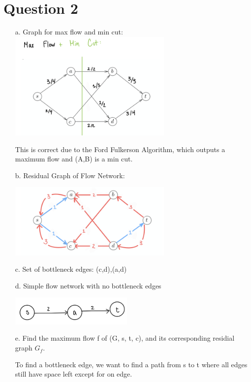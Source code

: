 \documentclass[12pt]{article}
\begin{document}
\section*{Question 2}
\begin{enumerate}
    \item[a.] Graph for max flow and min cut:\\
        
        \includegraphics[width=8cm]{Graphs/2A.png}

        This is correct due to the Ford Fulkerson Algorithm, which outputs a maximum flow and (A,B) is a min cut.

    \item[b.]  Residual Graph of Flow Network:

        \includegraphics[width=8cm]{Graphs/2B.png}

    \item[c. ]Set of bottleneck edges: {(c,d),(a,d)}
    \item[d. ] Simple flow network with no bottleneck edges
    
        \includegraphics[width=6cm]{Graphs/2C.png}

    \item[e. ] Find the maximum flow f of (G, s, t, c), and its corresponding residial
               graph $G_{f}$.
               
               To find a bottleneck edge, we want to find a path from s to t where all edges still
               have space left except for on edge. 
               


\end{enumerate}
\end{document}
